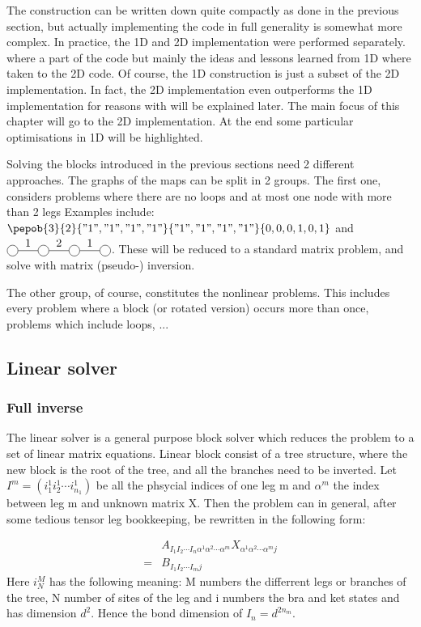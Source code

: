 The construction can be written down quite compactly as done in the previous section, but actually implementing the code in full generality is somewhat more complex. In practice, the 1D and 2D implementation were performed separately. where a part of the code but mainly the ideas and lessons learned from 1D where taken to the 2D code. Of course, the 1D construction is just a subset of the 2D implementation. In fact, the 2D implementation even outperforms the 1D implementation for reasons with will be explained later. The main focus of this chapter will go to the 2D implementation. At the end some particular optimisations in 1D will be highlighted.

Solving the blocks introduced in the previous sections need 2 different approaches. The graphs of the maps can be split in 2 groups. The first one, considers problems where there are no loops and at most one node with more than 2 legs Examples include:
$\pepob{3}{2}{{"1","1","1","1"}}{{"1","1","1","1"}}{{0,0,0,1,0,1}}$ and $\mpob{4}{ {,"1","2","1",}  }{}{}{}{{,,,,,}}$.
These will be reduced to a standard matrix problem, and solve with matrix (pseudo-) inversion.

The other group, of course, constitutes the nonlinear problems. This includes every problem where a block (or rotated version) occurs more than once, problems which include loops, ...

\subsection{Linear solver} \label{subsec:linear_solver}


\subsubsection{Full inverse}

The linear solver is a general purpose block solver which reduces the problem to a set of linear matrix equations. Linear block consist of a tree structure, where the new block is the root of the tree, and all the branches need to be inverted.  Let $ I^m = (i^1_1 i^1_2 \cdots i^1_{n_1})$ be all the phsycial indices of one leg m and $\alpha^m$ the index between leg m and unknown matrix X. Then the problem can in general, after some tedious tensor leg bookkeeping, be rewritten in the following form:

\begin{equation}
    \begin{split}
        &A_{ I_1  I_2 \cdots I_n \alpha^1 \alpha^2 \cdots \alpha^m   } X_{ \alpha^1 \alpha^2 \cdots \alpha^m j  } \\
        = &B_{  I_1  I_2 \cdots I_m   j }
    \end{split}
\end{equation}
Here $i^M_N$ has the following meaning: M numbers the differrent legs or branches of the tree, N number of sites of the leg and i numbers the bra and ket states and has dimension $d^2$. Hence the bond dimension of $I_n= d^{2 n_m }$.

